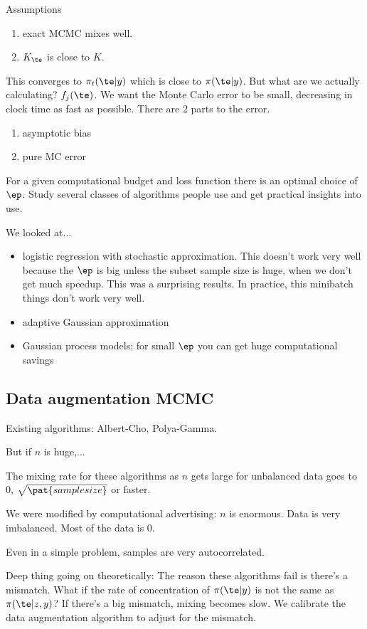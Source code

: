 Assumptions 
\begin{enumerate}
\item
exact MCMC mixes well. %
\item
$K_\te$ is close to $K$.
\end{enumerate}
This converges to $\pi_t(\te|y)$ which is close to $\pi(\te|y)$. But what are we actually calculating? $f_j(\te)$. We want the Monte Carlo error to be small, decreasing in clock time as fast as possible. %
There are 2 parts to the error.
\begin{enumerate}
\item
asymptotic bias
\item
pure MC error
\end{enumerate}
For a given computational budget and loss function there is an optimal choice of $\ep$.
Study several classes of algorithms people use and get practical insights into use.

We looked at...
\begin{itemize}
\item
logistic regression with stochastic approximation.
This doesn't work very well because the $\ep$ is big unless the subset sample size is huge, when we don't get much speedup. This was a surprising results. In practice, this minibatch things don't work very well.
\item
adaptive Gaussian approximation %
\item
Gaussian process models: for small $\ep$ you can get huge computational savings
\end{itemize}

\subsection{Data augmentation MCMC}

Existing algorithms: 
Albert-Cho, Polya-Gamma.

But if $n$ is huge,...

The mixing rate for these algorithms as $n$ gets large for unbalanced data goes to 0, $\sqrt{\pat{sample size}}$ or faster.

We were modified by computational advertising: $n$ is enormous. Data is very imbalanced. Most of the data is 0. 

Even in a simple problem, samples are very autocorrelated. %

Deep thing going on theoretically: The reason these algorithms fail is there's a mismatch. %
What if the rate of concentration of $\pi(\te|y)$ is not the same as $\pi(\te|z,y)$? If there's a big mismatch, mixing becomes slow.
We calibrate the data augmentation algorithm to adjust for the mismatch. 



